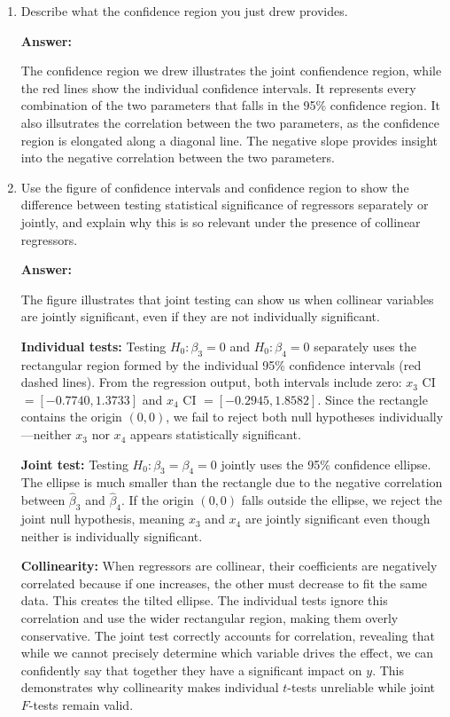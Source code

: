 \documentclass[12pt,a4paper]{article}
\begin{document}
\begin{enumerate}[label=(\roman*)]
  \item Describe what the confidence region you just drew provides.
  
  \textbf{Answer:} 

  The confidence region we drew illustrates the joint confiendence region, while the red lines show the individual confidence intervals.
  It represents every combination of the two parameters that falls in the 95\% confidence region. It also illsutrates the
  correlation between the two parameters, as the confidence region is elongated along a diagonal line. The negative slope provides 
  insight into the negative correlation between the two parameters.
  
  \item Use the figure of confidence intervals and confidence region to show the difference between testing statistical significance of regressors separately or jointly, and explain why this is so relevant under the presence of collinear regressors.
  
  \textbf{Answer:} 

The figure illustrates that joint testing can show us when collinear variables are jointly significant,
even if they are not individually significant.

\textbf{Individual tests:} Testing $H_0: \beta_3=0$ and 
$H_0: \beta_4=0$ separately uses the rectangular region formed by the 
individual 95\% confidence intervals (red dashed lines). From the regression output,
both intervals include zero: $x_3$ CI 
$= [-0.7740, 1.3733]$ and $x_4$ CI $= [-0.2945, 1.8582]$. Since the 
rectangle contains the origin $(0,0)$, we fail to reject both null 
hypotheses individually---neither $x_3$ nor $x_4$ appears statistically 
significant.

\textbf{Joint test:} Testing $H_0: \beta_3=\beta_4=0$ jointly uses the 
95\% confidence ellipse. The ellipse is much smaller than the rectangle 
due to the negative correlation between $\hat{\beta}_3$ and 
$\hat{\beta}_4$. If the origin $(0,0)$ falls outside the ellipse, we 
reject the joint null hypothesis, meaning $x_3$ and $x_4$ are jointly 
significant even though neither is individually significant.

\textbf{Collinearity:} When regressors are collinear, their 
coefficients are negatively correlated because if one increases, the other
must decrease to fit the same 
data. This creates the tilted ellipse. The individual tests ignore this 
correlation and use the wider rectangular region, making them overly 
conservative. The joint test correctly accounts for correlation, 
revealing that while we cannot precisely determine which variable drives 
the effect, we can confidently say that together they have a significant 
impact on $y$. This demonstrates why collinearity makes individual 
$t$-tests unreliable while joint $F$-tests remain valid.


\end{enumerate}
\end{document}
